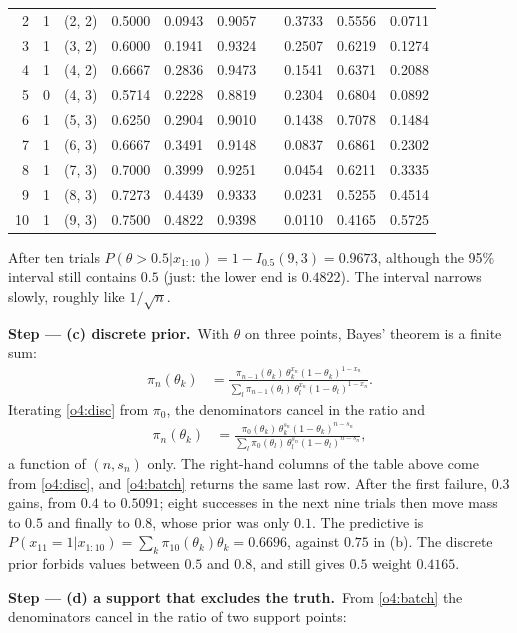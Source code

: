 \documentclass[11pt,a4paper]{article}
\newcommand{\passo}[2]{\par\smallskip\noindent\textbf{Step --- #1.}~#2}
\begin{document}
\begin{sol}
{\begin{center}
\begin{tabular}{rcccccc@{\qquad}ccc}
2 & 1 & (2, 2) & 0.5000 & 0.0943 & 0.9057 & & 0.3733 & 0.5556 & 0.0711\\
3 & 1 & (3, 2) & 0.6000 & 0.1941 & 0.9324 & & 0.2507 & 0.6219 & 0.1274\\
4 & 1 & (4, 2) & 0.6667 & 0.2836 & 0.9473 & & 0.1541 & 0.6371 & 0.2088\\
5 & 0 & (4, 3) & 0.5714 & 0.2228 & 0.8819 & & 0.2304 & 0.6804 & 0.0892\\
6 & 1 & (5, 3) & 0.6250 & 0.2904 & 0.9010 & & 0.1438 & 0.7078 & 0.1484\\
7 & 1 & (6, 3) & 0.6667 & 0.3491 & 0.9148 & & 0.0837 & 0.6861 & 0.2302\\
8 & 1 & (7, 3) & 0.7000 & 0.3999 & 0.9251 & & 0.0454 & 0.6211 & 0.3335\\
9 & 1 & (8, 3) & 0.7273 & 0.4439 & 0.9333 & & 0.0231 & 0.5255 & 0.4514\\
10 & 1 & (9, 3) & 0.7500 & 0.4822 & 0.9398 & & 0.0110 & 0.4165 & 0.5725\\
\bottomrule
\end{tabular}
\end{center}
After ten trials $P(\theta>0.5|x_{1:10})=1-I_{0.5}(9,3)=0.9673$, although the 95\% interval still contains $0.5$ (just: the lower end is $0.4822$). The interval narrows slowly, roughly like $1/\sqrt n$.}
\passo{(c) discrete prior}{With $\theta$ on three points, Bayes' theorem is a finite sum:
\begin{align}
\pi_n(\theta_k)&=\frac{\pi_{n-1}(\theta_k)\,\theta_k^{x_n}(1-\theta_k)^{1-x_n}}{\sum_{l}\pi_{n-1}(\theta_l)\,\theta_l^{x_n}(1-\theta_l)^{1-x_n}}.\label{o4:disc}
\end{align}
Iterating \eqref{o4:disc} from $\pi_0$, the denominators cancel in the ratio and
\begin{align}
\pi_n(\theta_k)&=\frac{\pi_0(\theta_k)\,\theta_k^{s_n}(1-\theta_k)^{n-s_n}}{\sum_l\pi_0(\theta_l)\,\theta_l^{s_n}(1-\theta_l)^{n-s_n}},\label{o4:batch}
\end{align}
a function of $(n,s_n)$ only. The right-hand columns of the table above come from \eqref{o4:disc}, and \eqref{o4:batch} returns the same last row. After the first failure, $0.3$ gains, from $0.4$ to $0.5091$; eight successes in the next nine trials then move mass to $0.5$ and finally to $0.8$, whose prior was only $0.1$. The predictive is $P(x_{11}=1|x_{1:10})=\sum_k\pi_{10}(\theta_k)\theta_k=0.6696$, against $0.75$ in (b). The discrete prior forbids values between $0.5$ and $0.8$, and still gives $0.5$ weight $0.4165$.}
\passo{(d) a support that excludes the truth}{From \eqref{o4:batch} the denominators cancel in the ratio of two support points:
}
\end{sol}
\end{document}
